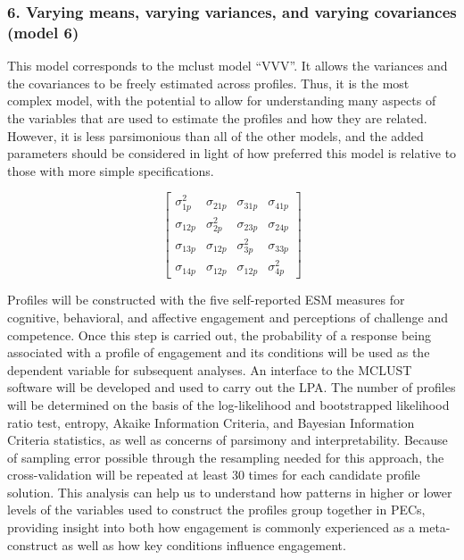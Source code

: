 \documentclass[]{book}
\theoremstyle{definition}
\theoremstyle{definition}
\theoremstyle{definition}
\theoremstyle{remark}
\begin{document}
\subsubsection{6. Varying means, varying variances, and varying
covariances (model
6)}\label{varying-means-varying-variances-and-varying-covariances-model-6}

This model corresponds to the mclust model ``VVV''. It allows the
variances and the covariances to be freely estimated across profiles.
Thus, it is the most complex model, with the potential to allow for
understanding many aspects of the variables that are used to estimate
the profiles and how they are related. However, it is less parsimonious
than all of the other models, and the added parameters should be
considered in light of how preferred this model is relative to those
with more simple specifications.

\[
\left[ \begin{matrix} { \sigma  }_{ 1p }^{ 2 } & { \sigma  }_{ 21p } & { \sigma  }_{ 31p } & { \sigma  }_{ 41p } \\ { \sigma  }_{ 12p } & { \sigma  }_{ 2p }^{ 2 } & { \sigma  }_{ 23p } & { \sigma  }_{ 24p } \\ { \sigma  }_{ 13p } & { \sigma  }_{ 12p } & { \sigma  }_{ 3p }^{ 2 } & { \sigma  }_{ 33p } \\ { \sigma  }_{ 14p } & { \sigma  }_{ 12p } & { \sigma  }_{ 12p } & { \sigma  }_{ 4p }^{ 2 } \end{matrix} \right] 
\]

Profiles will be constructed with the five self-reported ESM measures
for cognitive, behavioral, and affective engagement and perceptions of
challenge and competence. Once this step is carried out, the probability
of a response being associated with a profile of engagement and its
conditions will be used as the dependent variable for subsequent
analyses. An interface to the MCLUST software will be developed and used
to carry out the LPA. The number of profiles will be determined on the
basis of the log-likelihood and bootstrapped likelihood ratio test,
entropy, Akaike Information Criteria, and Bayesian Information Criteria
statistics, as well as concerns of parsimony and interpretability.
Because of sampling error possible through the resampling needed for
this approach, the cross-validation will be repeated at least 30 times
for each candidate profile solution. This analysis can help us to
understand how patterns in higher or lower levels of the variables used
to construct the profiles group together in PECs, providing insight into
both how engagement is commonly experienced as a meta-construct as well
as how key conditions influence engagement.
\end{document}
